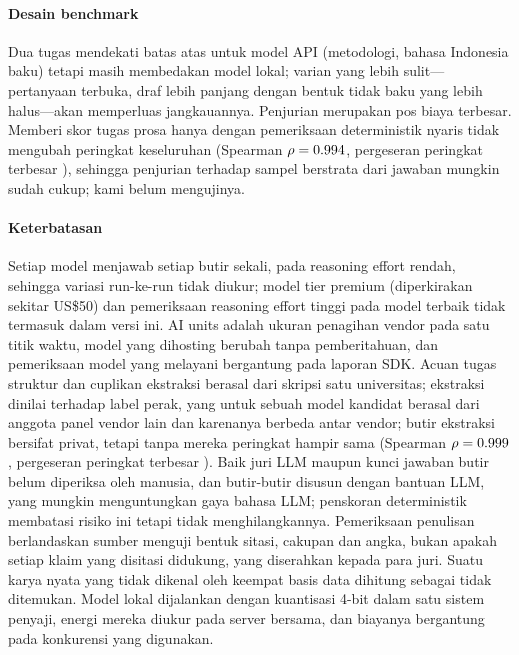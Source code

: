 \paragraph{Desain benchmark} Dua tugas mendekati batas atas untuk model API (metodologi, bahasa Indonesia baku) tetapi masih membedakan model lokal; varian yang lebih sulit---pertanyaan terbuka, draf lebih panjang dengan bentuk tidak baku yang lebih halus---akan memperluas jangkauannya. Penjurian merupakan pos biaya terbesar. Memberi skor tugas prosa hanya dengan pemeriksaan deterministik nyaris tidak mengubah peringkat keseluruhan (Spearman $\rho=0.994{}$, pergeseran peringkat terbesar \JudgeAutoShift{}), sehingga penjurian terhadap sampel berstrata dari jawaban mungkin sudah cukup; kami belum mengujinya.

\paragraph{Keterbatasan} Setiap model menjawab setiap butir sekali, pada reasoning effort rendah, sehingga variasi run-ke-run tidak diukur; \NPremium{} model tier premium (diperkirakan sekitar US\$50) dan pemeriksaan reasoning effort tinggi pada model terbaik tidak termasuk dalam versi ini. AI units adalah ukuran penagihan vendor pada satu titik waktu, model yang dihosting berubah tanpa pemberitahuan, dan pemeriksaan model yang melayani bergantung pada laporan SDK. Acuan tugas struktur dan cuplikan ekstraksi berasal dari skripsi satu universitas; ekstraksi dinilai terhadap label perak, yang untuk sebuah model kandidat berasal dari anggota panel vendor lain dan karenanya berbeda antar vendor; butir ekstraksi bersifat privat, tetapi tanpa mereka peringkat hampir sama (Spearman $\rho=0.999{}$, pergeseran peringkat terbesar \PubMaxShift{}). Baik juri LLM maupun kunci jawaban butir belum diperiksa oleh manusia, dan butir-butir disusun dengan bantuan LLM, yang mungkin menguntungkan gaya bahasa LLM; penskoran deterministik membatasi risiko ini tetapi tidak menghilangkannya. Pemeriksaan penulisan berlandaskan sumber menguji bentuk sitasi, cakupan dan angka, bukan apakah setiap klaim yang disitasi didukung, yang diserahkan kepada para juri. Suatu karya nyata yang tidak dikenal oleh keempat basis data dihitung sebagai tidak ditemukan. Model lokal dijalankan dengan kuantisasi 4-bit dalam satu sistem penyaji, energi mereka diukur pada server bersama, dan biayanya bergantung pada konkurensi yang digunakan.

